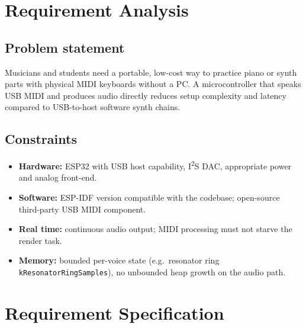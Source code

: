 \documentclass[11pt,a4paper]{article}
\begin{document}
\section{Requirement Analysis}

\subsection{Problem statement}
Musicians and students need a portable, low-cost way to practice piano or synth parts with physical MIDI keyboards without a PC. A microcontroller that speaks USB MIDI and produces audio directly reduces setup complexity and latency compared to USB-to-host software synth chains.

\subsection{Constraints}
\begin{itemize}[noitemsep]
  \item \textbf{Hardware:} ESP32 with USB host capability, I\textsuperscript{2}S DAC, appropriate power and analog front-end.
  \item \textbf{Software:} ESP-IDF version compatible with the codebase; open-source third-party USB MIDI component.
  \item \textbf{Real time:} continuous audio output; MIDI processing must not starve the render task.
  \item \textbf{Memory:} bounded per-voice state (e.g.\ resonator ring \texttt{kResonatorRingSamples}), no unbounded heap growth on the audio path.
\end{itemize}

\section{Requirement Specification}
\end{document}
